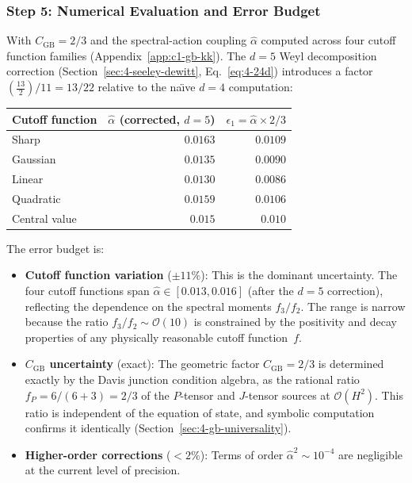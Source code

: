 \subsubsection{Step 5: Numerical Evaluation and Error Budget}

With $C_{\mathrm{GB}} = 2/3$ and the spectral-action coupling $\hat{\alpha}$ computed across four cutoff function families (Appendix~\ref{app:c1-gb-kk}). The $d = 5$ Weyl decomposition correction (Section~\ref{sec:4-seeley-dewitt}, Eq.~\eqref{eq:4-24d}) introduces a factor $(\tfrac{13}{2})/11 = 13/22$ relative to the na\"{\i}ve $d = 4$ computation:

\begin{center}
\begin{tabular}{l r r}
\hline
Cutoff function & $\hat{\alpha}$ (corrected, $d{=}5$) & $\epsilon_1 = \hat{\alpha} \times 2/3$ \\
\hline
Sharp      & $0.0163$ & $0.0109$ \\
Gaussian   & $0.0135$ & $0.0090$ \\
Linear     & $0.0130$ & $0.0086$ \\
Quadratic  & $0.0159$ & $0.0106$ \\
\hline
Central value & $\mathbf{0.015}$ & $\mathbf{0.010}$ \\
\hline
\end{tabular}
\end{center}

\noindent
The error budget is:
\begin{itemize}
  \item \textbf{Cutoff function variation} ($\pm 11\%$): This is the dominant uncertainty. The four cutoff functions span $\hat{\alpha} \in [0.013, 0.016]$ (after the $d = 5$ correction), reflecting the dependence on the spectral moments $f_3/f_2$. The range is narrow because the ratio $f_3/f_2 \sim \mathcal{O}(10)$ is constrained by the positivity and decay properties of any physically reasonable cutoff function~$f$.
  \item \textbf{$C_{\mathrm{GB}}$ uncertainty} (exact): The geometric factor $C_{\mathrm{GB}} = 2/3$ is determined exactly by the Davis junction condition algebra, as the rational ratio $f_P = 6/(6+3) = 2/3$ of the $P$-tensor and $J$-tensor sources at $\mathcal{O}(H^2)$. This ratio is independent of the equation of state, and symbolic computation confirms it identically (Section~\ref{sec:4-gb-universality}).
  \item \textbf{Higher-order corrections} ($< 2\%$): Terms of order $\hat{\alpha}^2 \sim 10^{-4}$ are negligible at the current level of precision.
\end{itemize}

